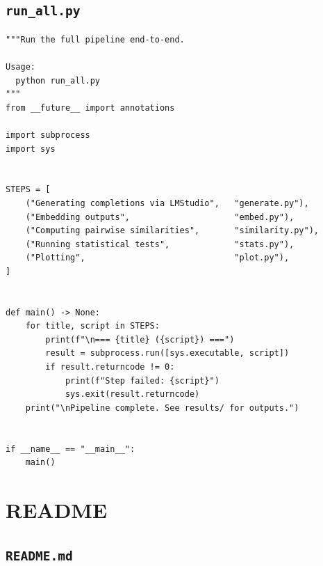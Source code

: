 \documentclass[11pt]{article}
\begin{document}
\subsection{\texttt{run\_all.py}}

\begin{lstlisting}
"""Run the full pipeline end-to-end.

Usage:
  python run_all.py
"""
from __future__ import annotations

import subprocess
import sys


STEPS = [
    ("Generating completions via LMStudio",   "generate.py"),
    ("Embedding outputs",                     "embed.py"),
    ("Computing pairwise similarities",       "similarity.py"),
    ("Running statistical tests",             "stats.py"),
    ("Plotting",                              "plot.py"),
]


def main() -> None:
    for title, script in STEPS:
        print(f"\n=== {title} ({script}) ===")
        result = subprocess.run([sys.executable, script])
        if result.returncode != 0:
            print(f"Step failed: {script}")
            sys.exit(result.returncode)
    print("\nPipeline complete. See results/ for outputs.")


if __name__ == "__main__":
    main()
\end{lstlisting}

\newpage

\section{README}

\subsection{\texttt{README.md}}
\end{document}
